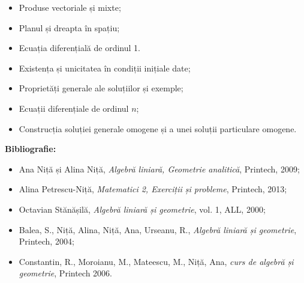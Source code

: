 \documentclass[a4paper,11pt]{article}
\begin{document}
\begin{itemize}
  \item Produse vectoriale și mixte;
  \item Planul și dreapta în spațiu;
    \vspace{0.5cm}

  \item Ecuația diferențială de ordinul 1. 
  \item Existența și unicitatea în condiții inițiale date;
  \item Proprietăți generale ale soluțiilor și exemple;
    \vspace{0.5cm}

  \item Ecuații diferențiale de ordinul $n$;
  \item Construcția soluției generale omogene și a unei soluții particulare omogene.
\end{itemize}

\newpage
\textbf{Bibliografie:}
\begin{itemize}
  \item Ana Niță și Alina Niță, \emph{Algebră liniară, Geometrie analitică}, Printech, 2009;
  \item Alina Petrescu-Niță, \emph{Matematici 2, Exerciții și probleme}, Printech, 2013;
  \item Octavian Stănășilă, \emph{Algebră liniară și geometrie}, vol. 1, ALL, 2000;
  \item Balea, S., Niță, Alina, Niță, Ana, Urseanu, R., \emph{Algebră liniară și geometrie}, Printech, 2004;
  \item Constantin, R., Moroianu, M., Mateescu, M., Niță, Ana, \emph{curs de algebră și geometrie}, Printech 2006.
\end{itemize}
\end{document}
